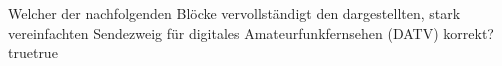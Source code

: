     {Welcher der nachfolgenden Blöcke vervollständigt den dargestellten, stark vereinfachten Sendezweig für digitales Amateurfunkfernsehen (DATV) korrekt?}
    {}
    {}
    {}
    {}
    {true}{true}